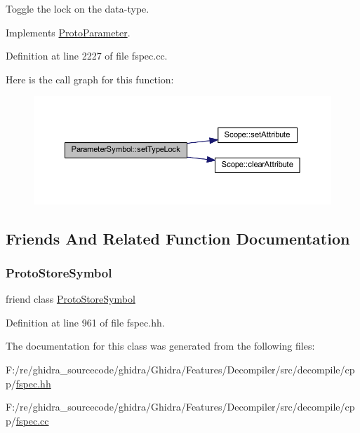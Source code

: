 Toggle the lock on the data-\/type. 



Implements \mbox{\hyperlink{class_proto_parameter_a91f745d13f913e959f724e7259c52fa2}{Proto\+Parameter}}.



Definition at line 2227 of file fspec.\+cc.

Here is the call graph for this function\+:
\nopagebreak
\begin{figure}[H]
\begin{center}
\leavevmode
\includegraphics[width=350pt]{class_parameter_symbol_a87a4c3430377ccdd1efa5c3c4d720e9c_cgraph}
\end{center}
\end{figure}


\subsection{Friends And Related Function Documentation}
\mbox{\label{class_parameter_symbol_a14513e6f8d8efb1443e66390f3e19ffc}} 
\subsubsection{\texorpdfstring{ProtoStoreSymbol}{ProtoStoreSymbol}}
{\footnotesize\ttfamily friend class \mbox{\hyperlink{class_proto_store_symbol}{Proto\+Store\+Symbol}}\hspace{0.3cm}{\ttfamily [friend]}}



Definition at line 961 of file fspec.\+hh.



The documentation for this class was generated from the following files\+:\begin{DoxyCompactItemize}
\item 
F\+:/re/ghidra\+\_\+sourcecode/ghidra/\+Ghidra/\+Features/\+Decompiler/src/decompile/cpp/\mbox{\hyperlink{fspec_8hh}{fspec.\+hh}}\item 
F\+:/re/ghidra\+\_\+sourcecode/ghidra/\+Ghidra/\+Features/\+Decompiler/src/decompile/cpp/\mbox{\hyperlink{fspec_8cc}{fspec.\+cc}}\end{DoxyCompactItemize}
